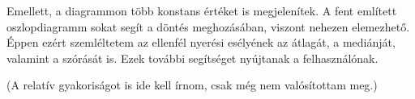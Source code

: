 Emellett, a diagrammon több konstans értéket is megjelenítek. A fent említett oszlopdiagramm sokat segít a döntés meghozásában, viszont nehezen elemezhető. Éppen ezért szemléltetem az ellenfél nyerési esélyének az átlagát, a mediánját, valamint a szórását is. Ezek további segítséget nyújtanak a felhasználónak.

(A relatív gyakoriságot is ide kell írnom, csak még nem valósítottam meg.)